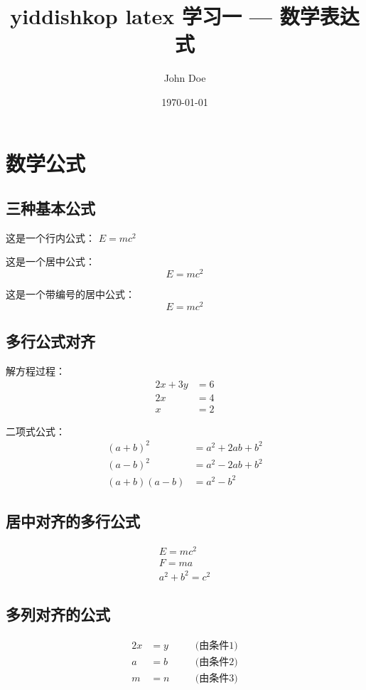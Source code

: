 \documentclass[a4paper,fontsize=8pt]{kaobook}
\title{yiddishkop latex 学习一 --- 数学表达式}
\author{John Doe}
\date{\today}
\begin{document}
\maketitle
\chapter{数学公式}

\section{三种基本公式}
这是一个行内公式： $E=mc^2$

这是一个居中公式：
\[
    E=mc^2
\]

这是一个带编号的居中公式：
\begin{equation}
    E=mc^2
\end{equation}

\section{多行公式对齐}

解方程过程：
\begin{align}
2x + 3y &= 6 \\
2x &=4\\
x &=2
\end{align}

二项式公式：
\begin{align}
    (a+b)^2 &= a^2 + 2ab + b^2 \\
    (a-b)^2 &= a^2 - 2ab + b^2 \\
    (a+b)(a-b) &= a^2 - b^2
\end{align}



\section{居中对齐的多行公式}

\begin{gather}
    E=mc^2 \\
    F=ma \\
    a^2 + b^2 = c^2
\end{gather}


\section{多列对齐的公式}

\begin{alignat}{2}
    x &= y & \quad & \text{(由条件1)} \\
    a &= b &       & \text{(由条件2)} \\
    m &= n &       & \text{(由条件3)}
\end{alignat}
\end{document}
